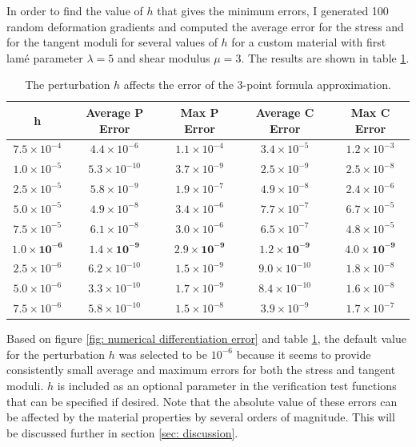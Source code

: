 \documentclass[]{spie}  %
\newcommand\Tstrut{\rule{0pt}{2.6ex}}         %
\begin{document}
In order to find the value of $h$ that gives the minimum errors, I generated 100 random deformation gradients and computed the average error for the stress and for the tangent moduli for several values of $h$ for a custom material with first lam\'e parameter $\lambda = 5$ and shear modulus $\mu = 3$. The results are shown in table \ref{table: h vs. error}.

\begin{table}[h]
	\centering
	\caption{The perturbation $h$ affects the error of the 3-point formula approximation.}
	\begin{tabular}{ | c | c | c | c | c | }
		\hline
		h & Average P Error & Max P Error & Average C Error & Max C Error \Tstrut \\ \hline
		$7.5 \times 10^{-4}$ & $4.4 \times 10^{-6}$  & $1.1 \times 10^{-4}$ & $3.4 \times 10^{-5}$ & $1.2 \times 10^{-3}$ \Tstrut \\
		$1.0 \times 10^{-5}$ & $5.3 \times 10^{-10}$ & $3.7 \times 10^{-9}$ & $2.5 \times 10^{-9}$ & $2.5 \times 10^{-8}$ \\
		$2.5 \times 10^{-5}$ & $5.8 \times 10^{-9}$  & $1.9 \times 10^{-7}$ & $4.9 \times 10^{-8}$ & $2.4 \times 10^{-6}$ \\
		$5.0 \times 10^{-5}$ & $4.9 \times 10^{-8}$  & $3.4 \times 10^{-6}$ & $7.7 \times 10^{-7}$ & $6.7 \times 10^{-5}$ \\
		$7.5 \times 10^{-5}$ & $6.1 \times 10^{-8}$  & $3.0 \times 10^{-6}$ & $6.5 \times 10^{-7}$ & $4.8 \times 10^{-5}$ \\
		$\bm{1.0 \times 10^{-6}}$ & $\bm{1.4 \times 10^{-9}}$  & $\bm{2.9 \times 10^{-9}}$ & $\bm{1.2 \times 10^{-9}}$ & $\bm{4.0 \times 10^{-9}}$ \\
		$2.5 \times 10^{-6}$ & $6.2 \times 10^{-10}$ & $1.5 \times 10^{-9}$ & $9.0 \times 10^{-10}$& $1.8 \times 10^{-8}$ \\
		$5.0 \times 10^{-6}$ & $3.3 \times 10^{-10}$ & $1.7 \times 10^{-9}$ & $8.4 \times 10^{-10}$& $1.6 \times 10^{-8}$ \\
		$7.5 \times 10^{-6}$ & $5.8 \times 10^{-10}$ & $1.5 \times 10^{-8}$ & $3.9 \times 10^{-9}$ & $1.7 \times 10^{-7}$ \\
		\hline
	\end{tabular}
\label{table: h vs. error}
\end{table}

Based on figure \ref{fig: numerical differentiation error} and table \ref{table: h vs. error}, the default value for the perturbation $h$ was selected to be $10^{-6}$ because it seems to provide consistently small average and maximum errors for both the stress and tangent moduli. $h$ is included as an optional parameter in the verification test functions that can be specified if desired. Note that the absolute value of these errors can be affected by the material properties by several orders of magnitude. This will be discussed further in section \ref{sec: discussion}.
\end{document}
